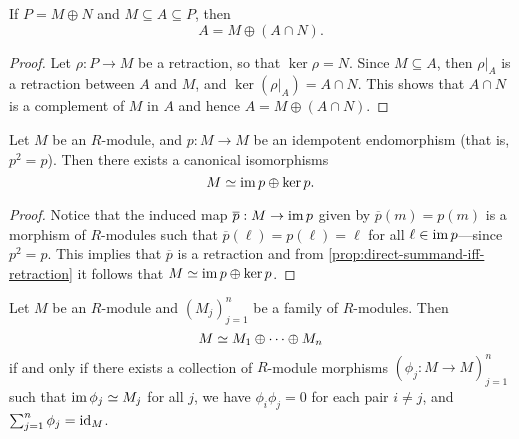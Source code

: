 \begin{corollary}
\label{cor:direct-summand-iff-retraction}
If \(P = M \oplus N\) and \(M \subseteq A \subseteq P\), then
\[
A = M \oplus (A \cap N).
\]
\end{corollary}

\begin{proof}
Let \(\rho: P \to M\) be a retraction, so that \(\ker \rho = N\). Since
\(M \subseteq A\), then \(\rho|_A\) is a retraction between \(A\) and \(M\), and
\(\ker(\rho|_A) = A \cap N\). This shows that \(A \cap N\) is a complement of
\(M\) in \(A\) and hence \(A = M \oplus (A \cap N)\).
\end{proof}

\begin{corollary}
\label{cor:module-iso-ker-im}
Let \(M\) be an \(R\)-module, and \(p: M \to M\) be an idempotent
endomorphism (that is, \(p^2 = p\)). Then there exists a canonical isomorphisms
\[
M \simeq \operatorname{im} p \oplus \ker p.
\]
\end{corollary}

\begin{proof}
Notice that the induced map \(\overline{p}: M \to \operatorname{im} p\) given by
\(\overline{p}(m) = p(m)\) is a morphism of \(R\)-modules such that
\(\overline{p}(\ell) = p(\ell) = \ell\) for all \(\ell \in \operatorname{im} p\)---since
\(p^2 = p\). This implies that \(\overline{p}\) is a retraction and from
\cref{prop:direct-summand-iff-retraction} it follows that
\(M \simeq \operatorname{im} p \oplus \ker p\).
\end{proof}

\begin{proposition}
\label{prop:direct-summand-decomposition}
Let \(M\) be an \(R\)-module and \((M_j)_{j=1}^n\) be a family of
\(R\)-modules. Then
\[
M \simeq M_1 \oplus \dots \oplus M_n
\]
if and only if there exists a collection of \(R\)-module morphisms
\((\phi_j: M \to M)_{j=1}^n\) such that \(\operatorname{im} \phi_j \simeq M_j\) for all \(j\),
we have \(\phi_i \phi_j = 0\) for each pair \(i \neq j\), and
\(\sum_{j = 1}^n \phi_j = \operatorname{id}_M\).
\end{proposition}

